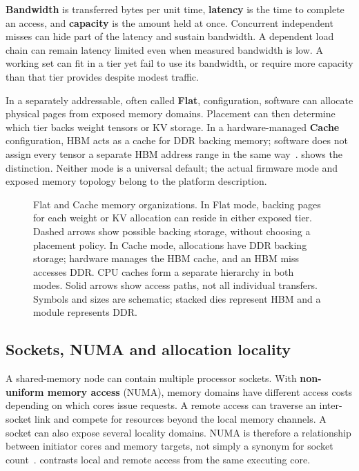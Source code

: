\textbf{Bandwidth} is transferred bytes per unit time,
\textbf{latency} is the time to complete an access, and
\textbf{capacity} is the amount held at once.  Concurrent independent
misses can hide part of the latency and sustain bandwidth.  A dependent
load chain can remain latency limited even when measured bandwidth is
low.  A working set can fit in a tier yet fail to use its bandwidth, or
require more capacity than that tier provides despite modest traffic.

In a separately addressable, often called \textbf{Flat}, configuration,
software can allocate physical pages from exposed memory domains.
Placement can then determine which tier backs weight tensors or KV
storage.  In a hardware-managed \textbf{Cache} configuration, HBM acts
as a cache for DDR backing memory; software does not assign every tensor
a separate HBM address range in the same way~\cite{intelmaxoverview}.
 shows the distinction.  Neither
mode is a universal default; the actual firmware mode and exposed
memory topology belong to the platform description.

\begin{figure}[htbp]
\centering

\caption{Flat and Cache memory organizations.  In Flat mode, backing
pages for each weight or KV allocation can reside in either exposed
tier.  Dashed arrows show possible backing storage, without choosing a
placement policy.  In Cache mode, allocations have DDR backing storage;
hardware manages the HBM cache, and an HBM miss accesses DDR.  CPU
caches form a separate hierarchy in both modes.  Solid arrows show
access paths, not all individual transfers.  Symbols and sizes are
schematic; stacked dies represent HBM and a module represents DDR.}
\label{fig:cpu-memory-organization}
\end{figure}
\FloatBarrier

\subsection{Sockets, NUMA and allocation locality}

A shared-memory node can contain multiple processor sockets.  With
\textbf{non-uniform memory access} (NUMA), memory domains have different
access costs depending on which cores issue requests.  A remote access
can traverse an inter-socket link and compete for resources beyond the
local memory channels.  A socket can also expose several locality
domains.  NUMA is therefore a relationship between initiator cores and
memory targets, not simply a synonym for socket count~\cite{linuxnumaperf}.
 contrasts local and remote access from
the same executing core.

